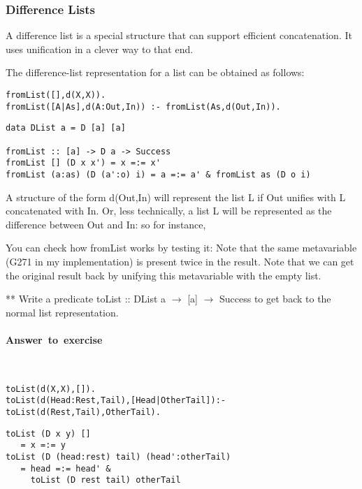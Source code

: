 \documentclass{article}
\newcounter{question}
\newenvironment{ans}{\begin{framed}\paragraph{Answer~to~exercise~\arabic{question}}}{\end{framed}}
\newcommand{\correctedLastYear}[1]{}
\begin{document}
\subsubsection{Difference Lists}

A difference list is a special structure that can support efficient
concatenation. It uses unification in a clever way to that end.

The difference-list representation for a list can be obtained as follows:

\Prolog{}
\begin{verbatim}
fromList([],d(X,X)).
fromList([A|As],d(A:Out,In)) :- fromList(As,d(Out,In)).
\end{verbatim}


\Curry{}
\begin{verbatim}
data DList a = D [a] [a]

fromList :: [a] -> D a -> Success
fromList [] (D x x') = x =:= x'
fromList (a:as) (D (a':o) i) = a =:= a' & fromList as (D o i)
\end{verbatim}


A structure of the form \textsf{d(Out,In)} will represent the list
\textsf{L} if \textsf{Out} unifies with \textsf{L} concatenated with
\textsf{In}. Or, less technically, a list L will be represented as the
difference between Out and In: so for instance,



You can check how fromList works by testing it:
Note that the same metavariable (G271 in my implementation) is present twice in
the result. Note that we can get the original result back by unifying this
metavariable with the empty list.

\begin{question}{**\correctedLastYear6}
Write a predicate \textsf{toList :: DList a $\rightarrow$ [a] $\rightarrow$ Success} to get back to the normal list representation.

\begin{ans}
~
\begin{verbatim}
toList(d(X,X),[]).
toList(d(Head:Rest,Tail),[Head|OtherTail]):- toList(d(Rest,Tail),OtherTail).
\end{verbatim}

\begin{verbatim}
toList (D x y) []
   = x =:= y
toList (D (head:rest) tail) (head':otherTail)
   = head =:= head' &
     toList (D rest tail) otherTail
\end{verbatim}

\end{ans}

\end{question}
\end{document}
